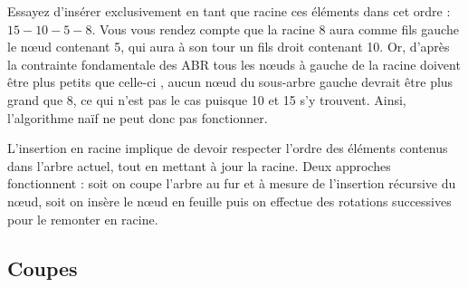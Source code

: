 \documentclass[11pt,a4paper]{article}
\begin{document}
\smallskip

Essayez d'insérer exclusivement en tant que racine ces éléments dans cet ordre : $ 15 - 10 - 5 - 8 $.
Vous vous rendez compte que la racine 8 aura comme fils gauche le nœud contenant 5, qui aura à son tour un fils droit contenant 10.
Or, d'après la contrainte fondamentale des ABR \og tous les nœuds à gauche de la racine doivent être plus petits que celle-ci \fg{}, aucun nœud du sous-arbre gauche devrait être plus grand que 8, ce qui n'est pas le cas puisque 10 et 15 s'y trouvent.
Ainsi, l'algorithme naïf ne peut donc pas fonctionner.

\bigskip

L'insertion en racine implique de devoir respecter l'ordre des éléments contenus dans l'arbre actuel, tout en mettant à jour la racine.
Deux approches fonctionnent : soit on coupe l'arbre au fur et à mesure de l'insertion récursive du nœud, soit on insère le nœud en feuille puis on effectue des rotations successives pour le remonter en racine.

\bigskip


\subsection{Coupes}

%
\end{document}
